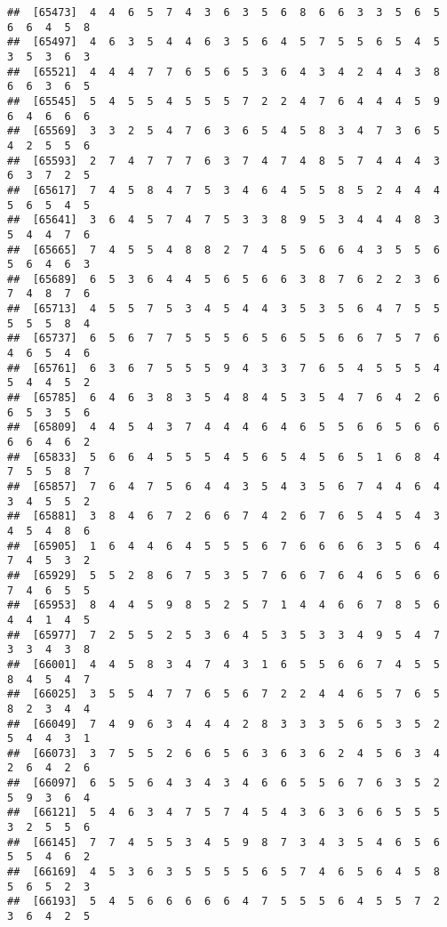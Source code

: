 \documentclass[
]{book}
\begin{document}
\begin{verbatim}
##  [65473]  4  4  6  5  7  4  3  6  3  5  6  8  6  6  3  3  5  6  5  6  6  4  5  8
##  [65497]  4  6  3  5  4  4  6  3  5  6  4  5  7  5  5  6  5  4  5  3  5  3  6  3
##  [65521]  4  4  4  7  7  6  5  6  5  3  6  4  3  4  2  4  4  3  8  6  6  3  6  5
##  [65545]  5  4  5  5  4  5  5  5  7  2  2  4  7  6  4  4  4  5  9  6  4  6  6  6
##  [65569]  3  3  2  5  4  7  6  3  6  5  4  5  8  3  4  7  3  6  5  4  2  5  5  6
##  [65593]  2  7  4  7  7  7  6  3  7  4  7  4  8  5  7  4  4  4  3  6  3  7  2  5
##  [65617]  7  4  5  8  4  7  5  3  4  6  4  5  5  8  5  2  4  4  4  5  6  5  4  5
##  [65641]  3  6  4  5  7  4  7  5  3  3  8  9  5  3  4  4  4  8  3  5  4  4  7  6
##  [65665]  7  4  5  5  4  8  8  2  7  4  5  5  6  6  4  3  5  5  6  5  6  4  6  3
##  [65689]  6  5  3  6  4  4  5  6  5  6  6  3  8  7  6  2  2  3  6  7  4  8  7  6
##  [65713]  4  5  5  7  5  3  4  5  4  4  3  5  3  5  6  4  7  5  5  5  5  5  8  4
##  [65737]  6  5  6  7  7  5  5  5  6  5  6  5  5  6  6  7  5  7  6  4  6  5  4  6
##  [65761]  6  3  6  7  5  5  5  9  4  3  3  7  6  5  4  5  5  5  4  5  4  4  5  2
##  [65785]  6  4  6  3  8  3  5  4  8  4  5  3  5  4  7  6  4  2  6  6  5  3  5  6
##  [65809]  4  4  5  4  3  7  4  4  4  6  4  6  5  5  6  6  5  6  6  6  6  4  6  2
##  [65833]  5  6  6  4  5  5  5  4  5  6  5  4  5  6  5  1  6  8  4  7  5  5  8  7
##  [65857]  7  6  4  7  5  6  4  4  3  5  4  3  5  6  7  4  4  6  4  3  4  5  5  2
##  [65881]  3  8  4  6  7  2  6  6  7  4  2  6  7  6  5  4  5  4  3  4  5  4  8  6
##  [65905]  1  6  4  4  6  4  5  5  5  6  7  6  6  6  6  3  5  6  4  7  4  5  3  2
##  [65929]  5  5  2  8  6  7  5  3  5  7  6  6  7  6  4  6  5  6  6  7  4  6  5  5
##  [65953]  8  4  4  5  9  8  5  2  5  7  1  4  4  6  6  7  8  5  6  4  4  1  4  5
##  [65977]  7  2  5  5  2  5  3  6  4  5  3  5  3  3  4  9  5  4  7  3  3  4  3  8
##  [66001]  4  4  5  8  3  4  7  4  3  1  6  5  5  6  6  7  4  5  5  8  4  5  4  7
##  [66025]  3  5  5  4  7  7  6  5  6  7  2  2  4  4  6  5  7  6  5  8  2  3  4  4
##  [66049]  7  4  9  6  3  4  4  4  2  8  3  3  3  5  6  5  3  5  2  5  4  4  3  1
##  [66073]  3  7  5  5  2  6  6  5  6  3  6  3  6  2  4  5  6  3  4  2  6  4  2  6
##  [66097]  6  5  5  6  4  3  4  3  4  6  6  5  5  6  7  6  3  5  2  5  9  3  6  4
##  [66121]  5  4  6  3  4  7  5  7  4  5  4  3  6  3  6  6  5  5  5  3  2  5  5  6
##  [66145]  7  7  4  5  5  3  4  5  9  8  7  3  4  3  5  4  6  5  6  5  5  4  6  2
##  [66169]  4  5  3  6  3  5  5  5  5  6  5  7  4  6  5  6  4  5  8  5  6  5  2  3
##  [66193]  5  4  5  6  6  6  6  6  4  7  5  5  5  6  4  5  5  7  2  3  6  4  2  5

\end{verbatim}
\end{document}
